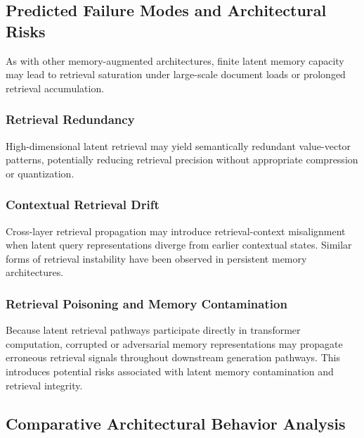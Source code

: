 \hypertarget{predicted-failure-modes-and-architectural-risks}{%
\subsection{Predicted Failure Modes and Architectural Risks}}
\label{predicted-failure-modes-and-architectural-risks}
\hypertarget{memory-saturation}{%
\label{memory-saturation}}
As with other memory-augmented architectures, finite latent memory capacity may lead to retrieval saturation under large-scale document loads or prolonged retrieval accumulation.
\hypertarget{retrieval-redundancy}{%
\subsubsection{Retrieval Redundancy}}
\label{retrieval-redundancy}
High-dimensional latent retrieval may yield semantically redundant value-vector patterns, potentially reducing retrieval precision without appropriate compression or quantization.
\hypertarget{contextual-retrieval-drift}{%
\subsubsection{Contextual Retrieval Drift}}
\label{contextual-retrieval-drift}
Cross-layer retrieval propagation may introduce retrieval-context misalignment when latent query representations diverge from earlier contextual states. Similar forms of retrieval instability have been observed in persistent memory architectures.
\hypertarget{retrieval-poisoning-and-memory-contamination}{%
\subsubsection{Retrieval Poisoning and Memory Contamination}}
\label{retrieval-poisoning-and-memory-contamination}
Because latent retrieval pathways participate directly in transformer computation, corrupted or adversarial memory representations may propagate erroneous retrieval signals throughout downstream generation pathways. This introduces potential risks associated with latent memory contamination and retrieval integrity.
\hypertarget{comparative-architectural-behavior-analysis}{%
\subsection {Comparative Architectural Behavior Analysis}}
